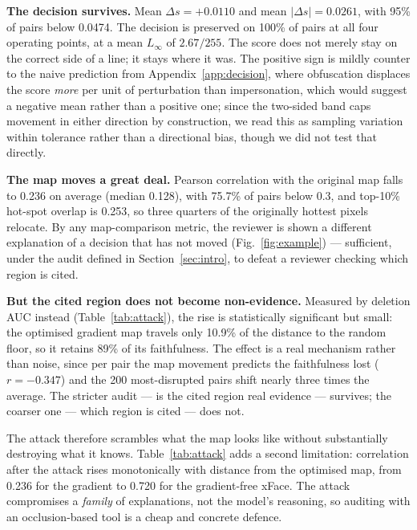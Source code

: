 \documentclass[conference,10pt]{IEEEtran}
\newcommand{\Linf}{L_\infty}
\newcommand{\dsim}{\Delta s}
\begin{document}
\textbf{The decision survives.} Mean $\dsim = +0.0110$ and mean $\lvert\dsim\rvert = 0.0261$,
with 95\% of pairs below 0.0474. The decision is preserved on 100\% of pairs at all four
operating points, at a mean $\Linf$ of $2.67/255$. The score does not merely stay on the
correct side of a line; it stays where it was. The positive sign is mildly counter to the naive
prediction from Appendix~\ref{app:decision}, where obfuscation displaces the score \emph{more}
per unit of perturbation than impersonation, which would suggest a negative mean rather than a
positive one; since the two-sided band caps movement in either direction by construction, we
read this as sampling variation within tolerance rather than a directional bias, though we did
not test that directly.

\textbf{The map moves a great deal.} Pearson correlation with the original map falls to 0.236
on average (median 0.128), with 75.7\% of pairs below 0.3, and top-10\% hot-spot overlap is
0.253, so three quarters of the originally hottest pixels relocate. By any map-comparison
metric, the reviewer is shown a different explanation of a decision that has not moved
(Fig.~\ref{fig:example}) — sufficient, under the audit defined in Section~\ref{sec:intro}, to
defeat a reviewer checking which region is cited.

\textbf{But the cited region does not become non-evidence.} Measured by deletion AUC instead
(Table~\ref{tab:attack}), the rise is statistically significant but small: the optimised
gradient map travels only 10.9\% of the distance to the random floor, so it retains 89\% of its
faithfulness. The effect is a real mechanism rather than noise, since per pair the map movement
predicts the faithfulness lost ($r = -0.347$) and the 200 most-disrupted pairs shift nearly
three times the average. The stricter audit — is the cited region real evidence — survives; the
coarser one — which region is cited — does not.

The attack therefore scrambles what the map looks like without substantially destroying what
it knows. Table~\ref{tab:attack} adds a second limitation: correlation after the attack rises
monotonically with distance from the optimised map, from 0.236 for the gradient to 0.720 for
the gradient-free xFace. The attack compromises a \emph{family} of explanations, not the
model's reasoning, so auditing with an occlusion-based tool is a cheap and concrete defence.
\end{document}
